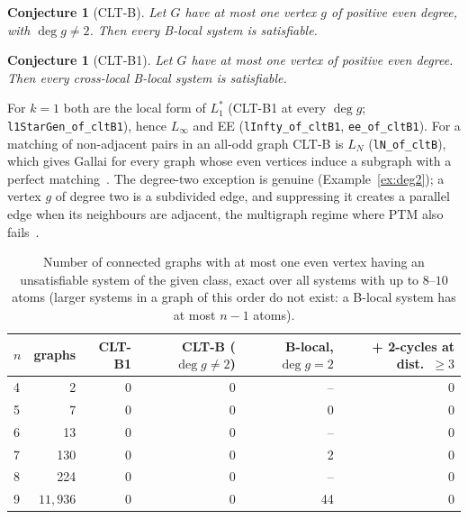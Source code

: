 \documentclass[11pt]{amsart}
\newtheorem{conjecture}[theorem]{Conjecture}
\theoremstyle{definition}
\newcommand{\lean}[1]{\quad{\footnotesize[Lean: \texttt{#1}]}}
\begin{document}
\begin{conjecture}[CLT-B]\label{conj:cltb}
Let $G$ have at most one vertex $g$ of positive even degree, with $\deg g\ne2$. Then every B-local
system is satisfiable.\lean{CLTB}
\end{conjecture}

\begin{conjecture}[CLT-B1]\label{conj:cltb1}
Let $G$ have at most one vertex of positive even degree. Then every cross-local B-local system is
satisfiable.\lean{CLTB1}
\end{conjecture}

For $k=1$ both are the local form of $L_1^*$ (CLT-B1 at every $\deg g$;
\texttt{l1StarGen\_of\_cltB1}), hence $L_\infty$ and EE (\texttt{lInfty\_of\_cltB1},
\texttt{ee\_of\_cltB1}). For a matching of non-adjacent pairs in an all-odd graph CLT-B is $L_N$
(\texttt{lN\_of\_cltB}), which gives Gallai for every graph whose even vertices induce a subgraph
with a perfect matching~\cite{RD}. The degree-two exception is genuine
(Example~\ref{ex:deg2}); a vertex $g$ of degree two is a subdivided edge, and suppressing it
creates a parallel edge when its neighbours are adjacent, the multigraph regime where PTM also
fails~\cite{TM}.

\begin{table}[t]\footnotesize
\begin{tabular}{@{}lrrrrr@{}}
\toprule
$n$ & graphs & CLT-B1 & CLT-B ($\deg g\ne2$) & B-local, $\deg g=2$ & + 2-cycles at dist.\ $\ge3$\\
\midrule
4 & 2 & 0 & 0 & -- & 0\\
5 & 7 & 0 & 0 & 0 & 0\\
6 & 13 & 0 & 0 & -- & 0\\
7 & 130 & 0 & 0 & 2 & 0\\
8 & 224 & 0 & 0 & -- & 0\\
9 & $11{,}936$ & 0 & 0 & 44 & 0\\
\bottomrule
\end{tabular}
\caption{Number of connected graphs with at most one even vertex having an unsatisfiable system
of the given class, exact over all systems with up to $8$--$10$ atoms (larger systems in a graph of
this order do not exist: a B-local system has at most $n-1$ atoms).}\label{tab:data}
\end{table}
\end{document}
